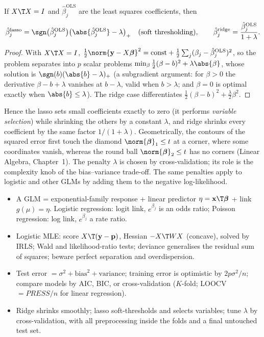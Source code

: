 \begin{theorem}\label{thm:lasso}
If $X\T X=I$ and $\hat\beta_j^{\mathrm{OLS}}$ are the least squares coefficients, then
\[ \hat\beta_j^{\mathrm{lasso}}=\sgn\big(\hat\beta_j^{\mathrm{OLS}}\big)\big(\abs{\hat\beta_j^{\mathrm{OLS}}}-\lambda\big)_+\quad\text{(soft thresholding)},\qquad\hat\beta_j^{\mathrm{ridge}}=\frac{\hat\beta_j^{\mathrm{OLS}}}{1+\lambda}. \]
\end{theorem}

\begin{proof}
With $X\T X=I$, $\tfrac12\norm{\mathbf{y}-X\boldsymbol\beta}^2=\text{const}+\tfrac12\sum_j(\beta_j-\hat\beta_j^{\mathrm{OLS}})^2$, so the problem separates into $p$ scalar problems $\min_\beta\tfrac12(\beta-b)^2+\lambda\abs{\beta}$, whose solution is $\sgn(b)(\abs{b}-\lambda)_+$ (a subgradient argument: for $\beta>0$ the derivative $\beta-b+\lambda$ vanishes at $b-\lambda$, valid when $b>\lambda$; and $\beta=0$ is optimal exactly when $\abs{b}\le\lambda$). The ridge case differentiates $\tfrac12(\beta-b)^2+\tfrac\lambda2\beta^2$.
\end{proof}

Hence the lasso sets small coefficients exactly to zero (it performs \emph{variable selection}) while shrinking the others by a constant $\lambda$, and ridge shrinks every coefficient by the same factor $1/(1+\lambda)$. Geometrically, the contours of the squared error first touch the diamond $\norm{\boldsymbol\beta}_1\le t$ at a corner, where some coordinates vanish, whereas the round ball $\norm{\boldsymbol\beta}_2\le t$ has no corners (Linear Algebra, Chapter~1). The penalty $\lambda$ is chosen by cross-validation; its role is the complexity knob of the bias--variance trade-off. The same penalties apply to logistic and other GLMs by adding them to the negative log-likelihood.

\begin{summarybox}
\begin{itemize}
  \item A GLM = exponential-family response + linear predictor $\eta=\mathbf{x}\T\boldsymbol\beta$ + link $g(\mu)=\eta$. Logistic regression: logit link, $e^{\beta_j}$ is an odds ratio; Poisson regression: log link, $e^{\beta_j}$ a rate ratio.
  \item Logistic MLE: score $X\T(\mathbf{y}-\mathbf{p})$, Hessian $-X\T WX$ (concave), solved by IRLS; Wald and likelihood-ratio tests; deviance generalises the residual sum of squares; beware perfect separation and overdispersion.
  \item Test error $=\sigma^2+\text{bias}^2+\text{variance}$; training error is optimistic by $2p\sigma^2/n$; compare models by AIC, BIC, or cross-validation ($K$-fold; LOOCV $=PRESS/n$ for linear regression).
  \item Ridge shrinks smoothly; lasso soft-thresholds and selects variables; tune $\lambda$ by cross-validation, with all preprocessing inside the folds and a final untouched test set.
\end{itemize}
\end{summarybox}

